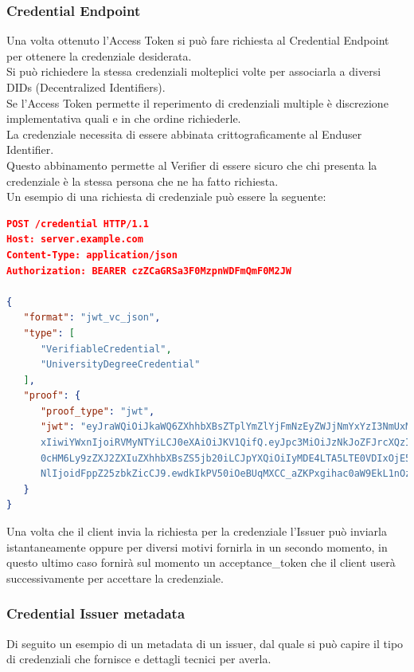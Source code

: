 \subsubsection{Credential Endpoint}
Una volta ottenuto l'Access Token si può fare richiesta al Credential Endpoint per ottenere la credenziale desiderata.\\
Si può richiedere la stessa credenziali molteplici volte per associarla a diversi DIDs (Decentralized Identifiers).\\
Se l'Access Token permette il reperimento di credenziali multiple è discrezione implementativa quali e in che ordine richiederle.\\
La credenziale necessita di essere abbinata crittograficamente al Enduser Identifier.\\
Questo abbinamento permette al Verifier di essere sicuro che chi presenta la credenziale è la stessa persona che ne ha fatto richiesta.\\
Un esempio di una richiesta di credenziale può essere la seguente:
\begin{lstlisting}[language=json,firstnumber=1]
POST /credential HTTP/1.1
Host: server.example.com
Content-Type: application/json
Authorization: BEARER czZCaGRSa3F0MzpnWDFmQmF0M2JW

{
   "format": "jwt_vc_json",
   "type": [
      "VerifiableCredential",
      "UniversityDegreeCredential"
   ],
   "proof": {
      "proof_type": "jwt",
      "jwt": "eyJraWQiOiJkaWQ6ZXhhbXBsZTplYmZlYjFmNzEyZWJjNmYxYzI3NmUxMmVjMjEva2V5cy8
      xIiwiYWxnIjoiRVMyNTYiLCJ0eXAiOiJKV1QifQ.eyJpc3MiOiJzNkJoZFJrcXQzIiwiYXVkIjoiaHR
      0cHM6Ly9zZXJ2ZXIuZXhhbXBsZS5jb20iLCJpYXQiOiIyMDE4LTA5LTE0VDIxOjE5OjEwWiIsIm5vbm
      NlIjoidFppZ25zbkZicCJ9.ewdkIkPV50iOeBUqMXCC_aZKPxgihac0aW9EkL1nOzM"
   }
}
\end{lstlisting}

Una volta che il client invia la richiesta per la credenziale l'Issuer può inviarla istantaneamente oppure per diversi motivi
fornirla in un secondo momento, in questo ultimo caso fornirà sul momento un acceptance\_token che il client userà successivamente per accettare
la credenziale.\\

\subsubsection{Credential Issuer metadata}
Di seguito un esempio di un metadata di un issuer, dal quale si può capire il tipo di credenziali che fornisce e dettagli tecnici per averla.

